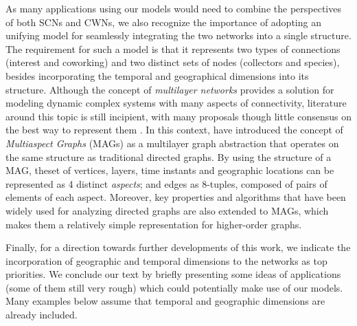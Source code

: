 As many applications using our models would need to combine the perspectives of both SCNs and CWNs, we also recognize the importance of adopting an unifying model for seamlessly integrating the two networks into a single structure.
The requirement for such a model is that it represents two types of connections (interest and coworking) and two distinct sets of nodes (collectors and species), besides incorporating the temporal and geographical dimensions into its structure.
Although the concept of \textit{multilayer networks} provides a solution for modeling dynamic complex systems with many aspects of connectivity, literature around this topic is still incipient, with many proposals though little consensus on the best way to represent them \cite{Kivela2014}.
In this context,  have introduced the concept of \textit{Multiaspect Graphs} (MAGs) as a multilayer graph abstraction that operates on the same structure as traditional directed graphs.
By using the structure of a MAG, theset of vertices, layers, time instants and geographic locations can be represented as 4 distinct \textit{aspects}; and edges as $8$-tuples, composed of pairs of elements of each aspect.
Moreover, key properties and algorithms that have been widely used for analyzing directed graphs are also extended to MAGs, which makes them a relatively simple representation for higher-order graphs.

Finally, for a direction towards further developments of this work, we indicate the incorporation of geographic and temporal dimensions to the networks as top priorities.
We conclude our text by briefly presenting some ideas of applications (some of them still very rough) which could potentially make use of our models. 
Many examples below assume that temporal and geographic dimensions are already included.


